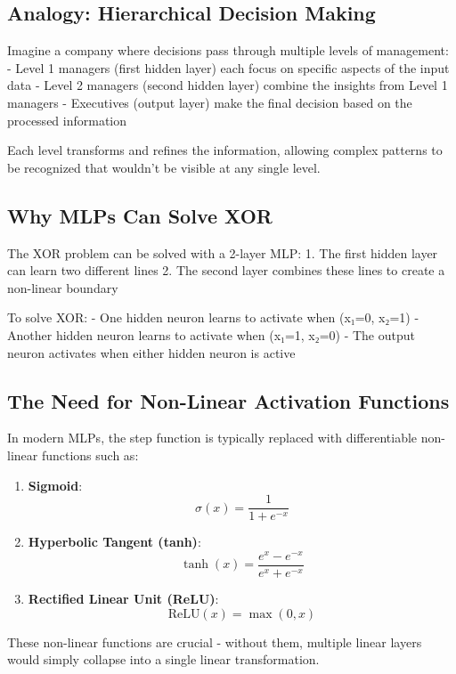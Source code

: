 \documentclass[
  letterpaper,
  DIV=11,
  numbers=noendperiod]{scrreprt}
\begin{document}
\subsection{Analogy: Hierarchical Decision
Making}\label{analogy-hierarchical-decision-making}

Imagine a company where decisions pass through multiple levels of
management: - Level 1 managers (first hidden layer) each focus on
specific aspects of the input data - Level 2 managers (second hidden
layer) combine the insights from Level 1 managers - Executives (output
layer) make the final decision based on the processed information

Each level transforms and refines the information, allowing complex
patterns to be recognized that wouldn't be visible at any single level.

\subsection{Why MLPs Can Solve XOR}\label{why-mlps-can-solve-xor}

The XOR problem can be solved with a 2-layer MLP: 1. The first hidden
layer can learn two different lines 2. The second layer combines these
lines to create a non-linear boundary

To solve XOR: - One hidden neuron learns to activate when (x₁=0, x₂=1) -
Another hidden neuron learns to activate when (x₁=1, x₂=0) - The output
neuron activates when either hidden neuron is active

\subsection{The Need for Non-Linear Activation
Functions}\label{the-need-for-non-linear-activation-functions}

In modern MLPs, the step function is typically replaced with
differentiable non-linear functions such as:

\begin{enumerate}
\def\labelenumi{\arabic{enumi}.}
\item
  \textbf{Sigmoid}: \[\sigma(x) = \frac{1}{1 + e^{-x}}\]
\item
  \textbf{Hyperbolic Tangent (tanh)}:
  \[\tanh(x) = \frac{e^x - e^{-x}}{e^x + e^{-x}}\]
\item
  \textbf{Rectified Linear Unit (ReLU)}: \[\text{ReLU}(x) = \max(0, x)\]
\end{enumerate}

These non-linear functions are crucial - without them, multiple linear
layers would simply collapse into a single linear transformation.
\end{document}
